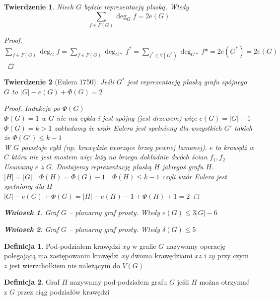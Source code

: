 \documentclass[12pt,a4paper]{article}
\newtheorem{tw}{Twierdzenie}
\theoremstyle{definition}
\newtheorem{df}{Definicja}
\newtheorem{wniosek}{Wniosek}
\begin{document}
\begin{tw}
Niech $G$ będzie reprezentacją płaską. Wtedy $$ \sum\limits_{f\in F(G)} \deg_Gf = 2e(G) $$
\begin{proof}
$ \sum\limits_{f\in F(G)} \deg_Gf = \sum\limits_{f\in F(G)} \deg_{G*}f^* = \sum\limits_{f^*\in V(G^*)} \deg_{G*}f* = 2e(G^*) = 2e(G)$
\end{proof}
\end{tw}

\begin{tw}[Eulera 1750]
Jeśli $G^*$ jest reprezentacją płaską grafu spójnego $G$ to $|G| - e(G) + \Phi(G) = 2$
\begin{proof}
Indukcja po $\Phi(G)$\\
$\Phi(G) = 1$ w $G$ nie ma cyklu i jest spójny (jest drzewem) więc $e(G) = |G|-1$\\
$\Phi(G) = k > 1$ zakładamy że wzór Eulera jest spełniony dla wszystkich $G'$ takich że $\Phi(G') \leqslant k-1$\\
W $G$ powstaje cykl (np. krawędzie tworzące brzeg pewnej łamanej). $e$ to krawędź w $C$ która nie jest mostem więc leży na brzegu dokładnie dwóch ścian $f_1, f_2$
Usuwamy $e$ z $G$. Dostajemy reprezentację płaską $H$ jakiegoś grafu $H$.\\
$|H| = |G| \quad \Phi(H) = \Phi(G) -1 \quad \Phi(H) \leqslant k-1$ czyli wzór Eulera jest spełniony dla $H$\\
$|G| - e(G) + \Phi(G) = |H| - e(H) - 1 + \Phi(H) + 1 = 2$
\end{proof}

\begin{wniosek}
Graf $G$ -- planarny graf prosty. Wtedy $e(G) \leqslant 3|G| -6$
\end{wniosek}
\begin{wniosek}\label{wniosek:2}
Graf $G$ -- planarny graf prosty. Wtedy $\delta(G) \leqslant 5$
\end{wniosek}
\end{tw}

\begin{df}
Pod-podziałem krawędzi $xy$ w grafie $G$ nazywamy operację polegającą ma zastępowaniu krawędzi $xy$ dwoma krawędziami $xz$ i $zy$ przy czym $z$ jest wierzchołkiem nie należącym do $V(G)$
\end{df}

\begin{df}
Graf $H$ nazywamy pod-podziałem grafu $G$ jeśli $H$ można otrzymać z $G$ przez ciąg podziałów krawędzi
\end{df}
\end{document}
